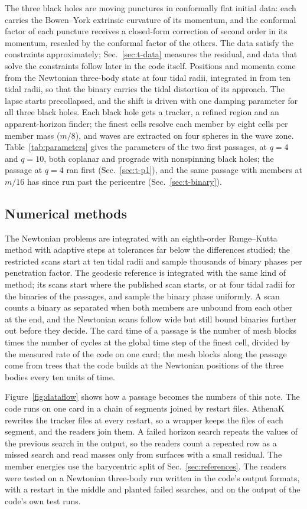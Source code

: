 \documentclass[aps,prd,twocolumn,10pt,superscriptaddress,nofootinbib,longbibliography,floatfix]{revtex4-2}
\begin{document}
The three black holes are moving punctures in conformally flat initial data: each carries the Bowen--York extrinsic curvature of its momentum, and the conformal factor of each puncture receives a closed-form correction of second order in its momentum, rescaled by the conformal factor of the others. The data satisfy the constraints approximately; Sec.~\ref{sec:t-data} measures the residual, and data that solve the constraints follow later in the code itself. Positions and momenta come from the Newtonian three-body state at four tidal radii, integrated in from ten tidal radii, so that the binary carries the tidal distortion of its approach. The lapse starts precollapsed, and the shift is driven with one damping parameter for all three black holes. Each black hole gets a tracker, a refined region and an apparent-horizon finder; the finest cells resolve each member by eight cells per member mass ($m/8$), and waves are extracted on four spheres in the wave zone. Table~\ref{tab:parameters} gives the parameters of the two first passages, at $q=4$ and $q=10$, both coplanar and prograde with nonspinning black holes; the passage at $q=4$ ran first (Sec.~\ref{sec:t-p1}), and the same passage with members at $m/16$ has since run past the pericentre (Sec.~\ref{sec:t-binary}).

\subsection{Numerical methods}\label{sec:methods}

The Newtonian problems are integrated with an eighth-order Runge--Kutta method with adaptive steps at tolerances far below the differences studied; the restricted scans start at ten tidal radii and sample thousands of binary phases per penetration factor. The geodesic reference is integrated with the same kind of method; its scans start where the published scan starts, or at four tidal radii for the binaries of the passages, and sample the binary phase uniformly. A scan counts a binary as separated when both members are unbound from each other at the end, and the Newtonian scans follow wide but still bound binaries further out before they decide. The card time of a passage is the number of mesh blocks times the number of cycles at the global time step of the finest cell, divided by the measured rate of the code on one card; the mesh blocks along the passage come from trees that the code builds at the Newtonian positions of the three bodies every ten units of time.

Figure~\ref{fig:dataflow} shows how a passage becomes the numbers of this note. The code runs on one card in a chain of segments joined by restart files. AthenaK rewrites the tracker files at every restart, so a wrapper keeps the files of each segment, and the readers join them. A failed horizon search repeats the values of the previous search in the output, so the readers count a repeated row as a missed search and read masses only from surfaces with a small residual. The member energies use the barycentric split of Sec.~\ref{sec:references}. The readers were tested on a Newtonian three-body run written in the code's output formats, with a restart in the middle and planted failed searches, and on the output of the code's own test runs.
\end{document}
